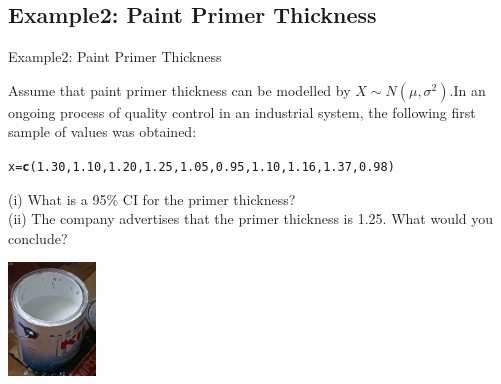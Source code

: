 \documentclass[t,xcolor=pdftex,dvipsnames,table]{beamer}\usepackage[]{graphicx}\usepackage[]{color}
\makeatletter
\newcommand{\hlnum}[1]{\textcolor[rgb]{0.686,0.059,0.569}{#1}}%
\newcommand{\hlstd}[1]{\textcolor[rgb]{0.345,0.345,0.345}{#1}}%
\newcommand{\hlkwb}[1]{\textcolor[rgb]{0.69,0.353,0.396}{#1}}%
\newcommand{\hlkwd}[1]{\textcolor[rgb]{0.737,0.353,0.396}{\textbf{#1}}}%
\newenvironment{kframe}{%
 \def\at@end@of@kframe{}%
 \ifinner\ifhmode%
  \def\at@end@of@kframe{\end{minipage}}%
  \begin{minipage}{\columnwidth}%
 \fi\fi%
 \def\FrameCommand##1{\hskip\@totalleftmargin \hskip-\fboxsep
 \colorbox{shadecolor}{##1}\hskip-\fboxsep
     \hskip-\linewidth \hskip-\@totalleftmargin \hskip\columnwidth}%
 \MakeFramed {\advance\hsize-\width
   \@totalleftmargin\z@ \linewidth\hsize
   \@setminipage}}%
 {\par\unskip\endMakeFramed%
 \at@end@of@kframe}
\newenvironment{knitrout}{}{} %
\makeatother
\begin{document}
\subsection[Examples]{Example2: Paint Primer Thickness}
\begin{frame}{Example2: Paint Primer Thickness}

Assume that paint primer thickness can be modelled by $X \sim N(\mu, \sigma^2)$.In an ongoing process of quality control in an industrial system, the following first sample of values was obtained:

\begin{knitrout}
\color{fgcolor}\begin{kframe}
\begin{alltt}
\hlstd{x}\hlkwb{=}\hlkwd{c}\hlstd{(}\hlnum{1.30}\hlstd{,}\hlnum{1.10}\hlstd{,}\hlnum{1.20}\hlstd{,}\hlnum{1.25}\hlstd{,}\hlnum{1.05}\hlstd{,}\hlnum{0.95}\hlstd{,}\hlnum{1.10}\hlstd{,}\hlnum{1.16}\hlstd{,}\hlnum{1.37}\hlstd{,}\hlnum{0.98}\hlstd{)}
\end{alltt}
\end{kframe}
\end{knitrout}

(i) What is a 95\% CI for the primer thickness? \\

(ii) The company advertises that the primer thickness is 1.25. What would you conclude?

\begin{center}
\includegraphics[height=3cm]{../images/Primer.jpg}
\end{center}
\end{frame}
\end{document}
